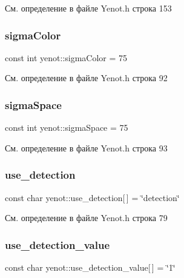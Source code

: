 См. определение в файле Yenot.\+h строка 153

\mbox{\label{namespaceyenot_a54032afcd8390f4a4975bbf20ffa248c}} 
\subsubsection{\texorpdfstring{sigma\+Color}{sigmaColor}}
{\footnotesize\ttfamily const int yenot\+::sigma\+Color = 75}



См. определение в файле Yenot.\+h строка 92

\mbox{\label{namespaceyenot_adbbb6d50f7db1942c60be8b5d621d3b7}} 
\subsubsection{\texorpdfstring{sigma\+Space}{sigmaSpace}}
{\footnotesize\ttfamily const int yenot\+::sigma\+Space = 75}



См. определение в файле Yenot.\+h строка 93

\mbox{\label{namespaceyenot_a17fec4b53b47f434f720ad8e804e3497}} 
\subsubsection{\texorpdfstring{use\+\_\+detection}{use\_detection}}
{\footnotesize\ttfamily const char yenot\+::use\+\_\+detection\mbox{[}$\,$\mbox{]} = \char`\"{}detection\char`\"{}}



См. определение в файле Yenot.\+h строка 79

\mbox{\label{namespaceyenot_affbdf7e1315bdd3e0c9f7bb5d1b0a9b1}} 
\subsubsection{\texorpdfstring{use\+\_\+detection\+\_\+value}{use\_detection\_value}}
{\footnotesize\ttfamily const char yenot\+::use\+\_\+detection\+\_\+value\mbox{[}$\,$\mbox{]} = \char`\"{}1\char`\"{}}



